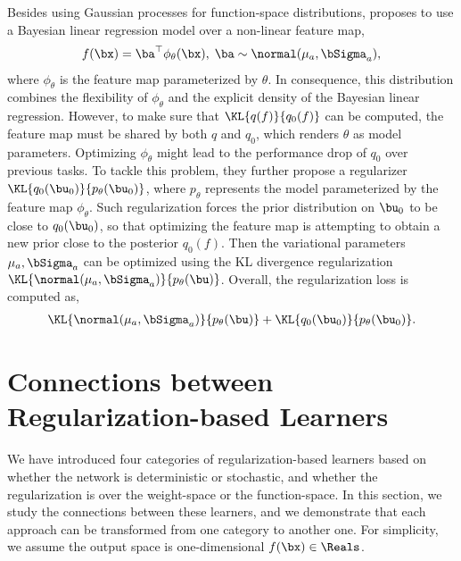 Besides using Gaussian processes for function-space distributions, \citet{titsias2019functional} proposes to use a Bayesian linear regression model over a non-linear feature map,
\begin{align}
    f(\bx) = \ba^{\top}\phi_{\theta}(\bx), \; \ba \sim \normal(\mu_a, \bSigma_a),
\end{align}
where $\phi_{\theta}$ is the feature map parameterized by $\theta$. In consequence, this distribution combines the flexibility of $\phi_{\theta}$ and the explicit density of the Bayesian linear regression. However, to make sure that $\KL{q(f)}{q_0(f)}$ can be computed, the feature map must be shared by both $q$ and $q_0$, which renders $\theta$ as model parameters. Optimizing $\phi_{\theta}$ might lead to the performance drop of $q_0$ over previous tasks. To tackle this problem, they further propose a regularizer $\KL{q_0(\bu_0)}{p_{\theta}(\bu_0)}$, where $p_{\theta}$ represents the model parameterized by the feature map $\phi_{\theta}$. Such regularization forces the prior distribution on $\bu_0$ to be close to $q_0(\bu_0)$, so that optimizing the feature map is attempting to obtain a new prior close to the posterior $q_0(f)$. Then the variational parameters $\mu_a, \bSigma_a$ can be optimized using the KL divergence regularization $\KL{\normal(\mu_a, \bSigma_a)}{p_{\theta}(\bu)}$. Overall, the regularization loss is computed as,
\begin{align}
    \KL{\normal(\mu_a, \bSigma_a)}{p_{\theta}(\bu)} + \KL{q_0(\bu_0)}{p_{\theta}(\bu_0)}.
\end{align}



\section{Connections between Regularization-based Learners}
We have introduced four categories of regularization-based learners based on whether the network is deterministic or stochastic, and whether the regularization is over the weight-space or the function-space. In this section, we study the connections between these learners, and we demonstrate that each approach can be transformed from one category to another one. For simplicity, we assume the output space is one-dimensional $f(\bx) \in \Reals$.

